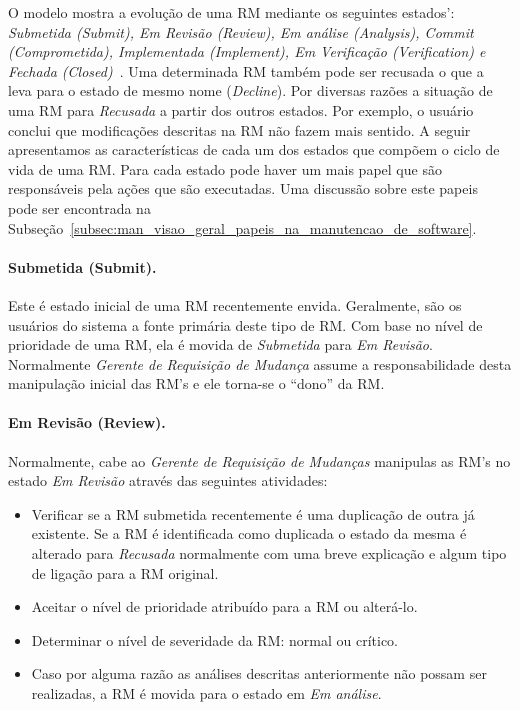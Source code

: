 O modelo mostra a evolução de uma RM mediante os seguintes estados':
\textit{Submetida (Submit), Em Revisão (Review), Em análise (Analysis), Commit
	(Comprometida), Implementada (Implement), Em Verificação (Verification) e
	Fechada (Closed)}~\cite{tripathy2014software}. Uma determinada RM também
pode ser recusada o que a leva para o estado de mesmo nome (\textit{Decline}).
Por diversas razões a situação de uma RM para \textit{Recusada} a partir dos
outros estados. Por exemplo, o usuário conclui que modificações descritas na RM
não fazem mais sentido. A seguir apresentamos as características de cada um dos
estados que compõem o ciclo de vida de uma RM\@. Para cada estado pode haver um
mais papel que são responsáveis pela ações que são executadas. Uma discussão
sobre este papeis pode ser encontrada na
Subseção~\ref{subsec:man_visao_geral_papeis_na_manutencao_de_software}.

\paragraph{Submetida (Submit).}
\label{par:submetida)}

Este é estado inicial de uma RM recentemente envida. Geralmente, são os usuários
do sistema a fonte primária deste tipo de RM. Com base no nível de prioridade de
uma RM, ela é movida de \textit{Submetida} para \textit{Em Revisão}. Normalmente
\textit{Gerente de Requisição de Mudança} assume a responsabilidade desta
manipulação inicial das RM's e ele torna-se o ``dono'' da RM.

\paragraph{Em Revisão (Review).}
\label{par:em_revisao}
Normalmente, cabe ao \textit{Gerente de Requisição de Mudanças} manipulas as
RM's no estado \textit{Em Revisão} através das seguintes atividades:

\begin{itemize}
	\item Verificar se a RM submetida recentemente é uma duplicação de outra já
		existente. Se a RM é identificada como duplicada o estado da mesma é
		alterado para \textit{Recusada} normalmente com uma breve explicação e
		algum tipo de ligação para a RM original.
	\item Aceitar o nível de prioridade atribuído para a RM ou alterá-lo.
	\item Determinar o nível de severidade da RM: normal ou crítico.
	\item Caso por alguma razão as análises descritas anteriormente não possam
		ser realizadas, a RM é movida para o estado em \textit{Em análise}.
\end{itemize}

